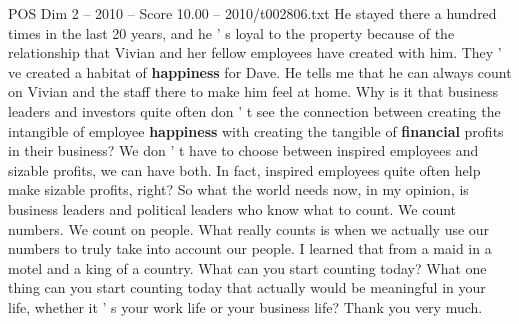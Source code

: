 \begin{textsample}{POS Dim 2 – 2010 – Score 10.00 – 2010/t002806.txt}
He stayed there a hundred times in the last 20 years, and he ' s loyal to the property because of the relationship that Vivian and her fellow employees have created with him.
They ' ve created a habitat of \textbf{happiness} for Dave.
He tells me that he can always count on Vivian and the staff there to make him feel at home.
Why is it that business leaders and investors quite often don ' t see the connection between creating the intangible of employee \textbf{happiness} with creating the tangible of \textbf{financial} profits in their business?
We don ' t have to choose between inspired employees and sizable profits, we can have both.
In fact, inspired employees quite often help make sizable profits, right?
So what the world needs now, in my opinion, is business leaders and political leaders who know what to count.
We count numbers.
We count on people.
What really counts is when we actually use our numbers to truly take into account our people.
I learned that from a maid in a motel and a king of a country.
What can you start counting today?
What one thing can you start counting today that actually would be meaningful in your life, whether it ' s your work life or your business life?
Thank you very much.

\end{textsample}
